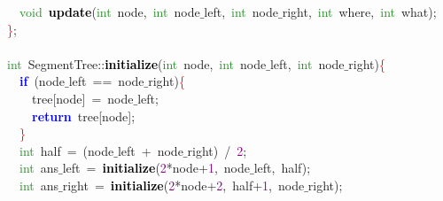 {{\mbox{}\ \ \textcolor{ForestGreen}{void}\ \textbf{\textcolor{Black}{update}}\textcolor{BrickRed}{(}\textcolor{ForestGreen}{int}\ node\textcolor{BrickRed}{,}\ \textcolor{ForestGreen}{int}\ node$\_$left\textcolor{BrickRed}{,}\ \textcolor{ForestGreen}{int}\ node$\_$right\textcolor{BrickRed}{,}\ \textcolor{ForestGreen}{int}\ where\textcolor{BrickRed}{,}\ \textcolor{ForestGreen}{int}\ what\textcolor{BrickRed}{);} \\
\mbox{}\textcolor{Red}{\}}\textcolor{BrickRed}{;} \\
\mbox{} \\
\mbox{}\textcolor{ForestGreen}{int}\ SegmentTree\textcolor{BrickRed}{::}\textbf{\textcolor{Black}{initialize}}\textcolor{BrickRed}{(}\textcolor{ForestGreen}{int}\ node\textcolor{BrickRed}{,}\ \textcolor{ForestGreen}{int}\ node$\_$left\textcolor{BrickRed}{,}\ \textcolor{ForestGreen}{int}\ node$\_$right\textcolor{BrickRed}{)}\textcolor{Red}{\{} \\
\mbox{}\ \ \textbf{\textcolor{Blue}{if}}\ \textcolor{BrickRed}{(}node$\_$left\ \textcolor{BrickRed}{==}\ node$\_$right\textcolor{BrickRed}{)}\textcolor{Red}{\{} \\
\mbox{}\ \ \ \ tree\textcolor{BrickRed}{[}node\textcolor{BrickRed}{]}\ \textcolor{BrickRed}{=}\ node$\_$left\textcolor{BrickRed}{;} \\
\mbox{}\ \ \ \ \textbf{\textcolor{Blue}{return}}\ tree\textcolor{BrickRed}{[}node\textcolor{BrickRed}{];} \\
\mbox{}\ \ \textcolor{Red}{\}} \\
\mbox{}\ \ \textcolor{ForestGreen}{int}\ half\ \textcolor{BrickRed}{=}\ \textcolor{BrickRed}{(}node$\_$left\ \textcolor{BrickRed}{+}\ node$\_$right\textcolor{BrickRed}{)}\ \textcolor{BrickRed}{/}\ \textcolor{Purple}{2}\textcolor{BrickRed}{;} \\
\mbox{}\ \ \textcolor{ForestGreen}{int}\ ans$\_$left\ \textcolor{BrickRed}{=}\ \textbf{\textcolor{Black}{initialize}}\textcolor{BrickRed}{(}\textcolor{Purple}{2}\textcolor{BrickRed}{*}node\textcolor{BrickRed}{+}\textcolor{Purple}{1}\textcolor{BrickRed}{,}\ node$\_$left\textcolor{BrickRed}{,}\ half\textcolor{BrickRed}{);} \\
\mbox{}\ \ \textcolor{ForestGreen}{int}\ ans$\_$right\ \textcolor{BrickRed}{=}\ \textbf{\textcolor{Black}{initialize}}\textcolor{BrickRed}{(}\textcolor{Purple}{2}\textcolor{BrickRed}{*}node\textcolor{BrickRed}{+}\textcolor{Purple}{2}\textcolor{BrickRed}{,}\ half\textcolor{BrickRed}{+}\textcolor{Purple}{1}\textcolor{BrickRed}{,}\ node$\_$right\textcolor{BrickRed}{);} \\
}}
